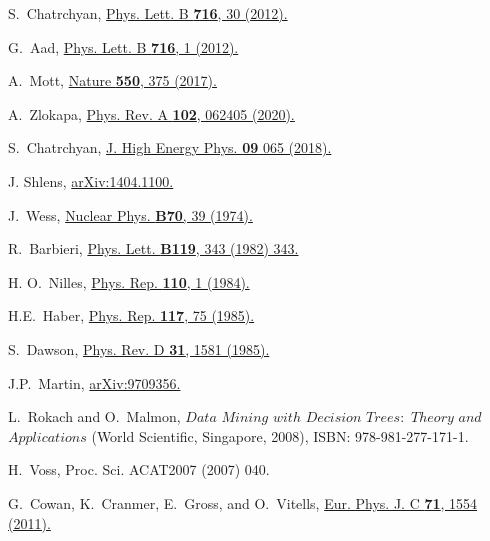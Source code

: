 \documentclass{article}
\begin{document}

\begin{thebibliography}{9}

  S.~Chatrchyan,
  \href{https://doi.org/10.1016/j.physletb.2012.08.021}
       {Phys. Lett. B \textbf{716}, 30 (2012).}

  G.~Aad,
  \href{https://doi.org/10.1016/j.physletb.2012.08.020}
       {Phys. Lett. B \textbf{716}, 1 (2012).}

  A.~Mott,
  \href{https://doi.org/10.1038/nature24047}
  {Nature \textbf{550}, 375 (2017).}

  A.~Zlokapa,
  \href{https://doi.org/10.1103/PhysRevA.102.062405}
  {Phys. Rev. A \textbf{102}, 062405 (2020).}

  S.~Chatrchyan,
  \href{https://doi.org/10.1007/JHEP09(2018)065}
  {J. High Energy Phys. \textbf{09} 065 (2018).}

  J. Shlens,
  \href{https://arxiv.org/abs/1404.1100}
  {arXiv:1404.1100.}

  J.~Wess,
  \href{https://doi.org/10.1016/0550-3213(74)90355-1}
       {Nuclear Phys. \textbf{B70}, 39 (1974).}

  R.~Barbieri,
  \href{https://doi.org/10.1016/0370-2693(82)90685-2}
  {Phys. Lett. \textbf{B119}, 343 (1982) 343.}

  H. O.~Nilles,
  \href{https://doi.org/10.1016/0370-1573(84)90008-5}
       {Phys. Rep. \textbf{110}, 1 (1984).}

  H.E.~Haber,
  \href{https://doi.org/10.1016/0370-1573(85)90051-1}
       {Phys. Rep. \textbf{117}, 75 (1985).}

  S.~Dawson,
  \href{https://doi.org/10.1103/PhysRevD.31.1581}
       {Phys. Rev. D \textbf{31}, 1581 (1985).}

  J.P.~Martin,
  \href{https://doi.org/10.1142/9789812839657\_0001}
  {arXiv:9709356.}

  L.~Rokach and O.~Malmon, $Data$ $Mining$ $with$ $Decision$ $Trees:$ $Theory$ $and$ $Applications$
  (World Scientific, Singapore, 2008), ISBN: 978-981-277-171-1.

  H.~Voss, Proc. Sci. ACAT2007 (2007) 040.

  G.~Cowan, K.~Cranmer, E.~Gross, and O.~Vitells,
  \href{https://doi.org/10.1140/epjc/s10052-011-1554-0}
  {Eur. Phys. J. C \textbf{71}, 1554 (2011).}


\end{thebibliography}
\end{document}
